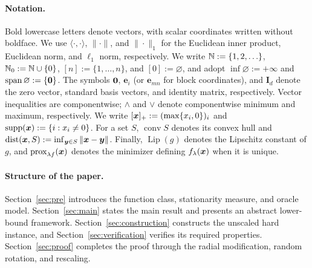 \paragraph{Notation.}
Bold lowercase letters denote vectors, with scalar coordinates
written without boldface. We use $\langle\cdot,\cdot\rangle$,
$\|\cdot\|$, and $\|\cdot\|_1$ for the Euclidean inner product,
Euclidean norm, and $\ell_1$ norm, respectively.
We write ${\mathbb{N}}:=\{1,2,\ldots\}$, ${\mathbb{N}}_0:={\mathbb{N}}\cup\{0\}$,
$[n]:=\{1,\ldots,n\}$, and $[0]:=\varnothing$,
and adopt $\inf\varnothing:=+\infty$ and
$\operatorname{span}\varnothing:=\{{\mathbf 0}\}$.
The symbols ${\mathbf 0}$, $\bm e_i$ (or $\bm e_{mn}$ for block
coordinates), and $\mathbf I_d$ denote the zero vector,
standard basis vectors, and identity matrix, respectively.
Vector inequalities are componentwise; $\wedge$ and $\vee$
denote componentwise minimum and maximum, respectively.
We write $[\bm{x}]_+:=(\max\{x_i,0\})_i$ and
$\operatorname{supp}(\bm{x}):=\{i:x_i\ne0\}$.
For a set $S$, $\operatorname{conv}S$ denotes its convex hull
and $\operatorname{dist}(\bm{x},S):=\inf_{\bm{y}\in S}\|\bm{x}-\bm{y}\|$.
Finally, $\operatorname{Lip}(g)$ denotes the  Lipschitz
constant of $g$, and $\operatorname{prox}_{\lambda f}(\bm{x})$ denotes the
minimizer defining $f_\lambda(\bm{x})$ when it is unique.

\paragraph{Structure of the paper.} Section~\ref{sec:pre} introduces the function class,
stationarity measure, and oracle model.
Section~\ref{sec:main} states the main result
and presents an abstract lower-bound framework.
Section~\ref{sec:construction} constructs the unscaled
hard instance, and Section~\ref{sec:verification}
verifies its required properties.
Section~\ref{sec:proof} completes the proof through
the radial modification, random rotation, and rescaling.



